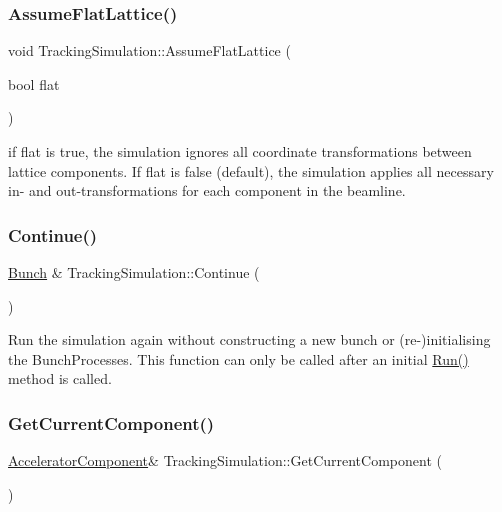 \subsubsection{\texorpdfstring{Assume\+Flat\+Lattice()}{AssumeFlatLattice()}}
{\footnotesize\ttfamily void Tracking\+Simulation\+::\+Assume\+Flat\+Lattice (\begin{DoxyParamCaption}\item[{bool}]{flat }\end{DoxyParamCaption})}

if flat is true, the simulation ignores all coordinate transformations between lattice components. If flat is false (default), the simulation applies all necessary in-\/ and out-\/transformations for each component in the beamline. \mbox{\label{classTrackingSimulation_ae618402f5a2bb8215da464157e5675e6}} 
\subsubsection{\texorpdfstring{Continue()}{Continue()}}
{\footnotesize\ttfamily \hyperlink{classBunch}{Bunch} \& Tracking\+Simulation\+::\+Continue (\begin{DoxyParamCaption}{ }\end{DoxyParamCaption})\hspace{0.3cm}{\ttfamily [virtual]}}

Run the simulation again without constructing a new bunch or (re-\/)initialising the Bunch\+Processes. This function can only be called after an initial \hyperlink{classTrackingSimulation_a09502165e1c358b1b30ff35a26910a1d}{Run()} method is called. \mbox{\label{classTrackingSimulation_a66d2ecb8dc7a799b92cc5e4d179defb2}} 
\subsubsection{\texorpdfstring{Get\+Current\+Component()}{GetCurrentComponent()}}
{\footnotesize\ttfamily \hyperlink{classAcceleratorComponent}{Accelerator\+Component}\& Tracking\+Simulation\+::\+Get\+Current\+Component (\begin{DoxyParamCaption}{ }\end{DoxyParamCaption})\hspace{0.3cm}{\ttfamily [inline]}}

